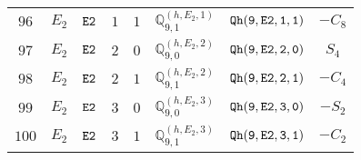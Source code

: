 \documentclass[fleqn,8pt]{jsarticle}
\begin{document}
\begin{table}[ht!]
\begin{center}
\begin{tabular}{cccccccc}
$ 96 $ & $ E_{2} $ & $ {\tt E2} $ & $ 1 $ & $ 1 $ & $ \mathbb{Q}_{9,1}^{(h,E_{2},1)} $ & $ {\tt Qh(9,E2,1,1)} $ & $ - C_{8} $ \\
$ 97 $ & $ E_{2} $ & $ {\tt E2} $ & $ 2 $ & $ 0 $ & $ \mathbb{Q}_{9,0}^{(h,E_{2},2)} $ & $ {\tt Qh(9,E2,2,0)} $ & $ S_{4} $ \\
$ 98 $ & $ E_{2} $ & $ {\tt E2} $ & $ 2 $ & $ 1 $ & $ \mathbb{Q}_{9,1}^{(h,E_{2},2)} $ & $ {\tt Qh(9,E2,2,1)} $ & $ - C_{4} $ \\
$ 99 $ & $ E_{2} $ & $ {\tt E2} $ & $ 3 $ & $ 0 $ & $ \mathbb{Q}_{9,0}^{(h,E_{2},3)} $ & $ {\tt Qh(9,E2,3,0)} $ & $ - S_{2} $ \\
$ 100 $ & $ E_{2} $ & $ {\tt E2} $ & $ 3 $ & $ 1 $ & $ \mathbb{Q}_{9,1}^{(h,E_{2},3)} $ & $ {\tt Qh(9,E2,3,1)} $ & $ - C_{2} $ \\
 \hline \hline
\end{tabular}
\end{center}
\end{table}
\end{document}
